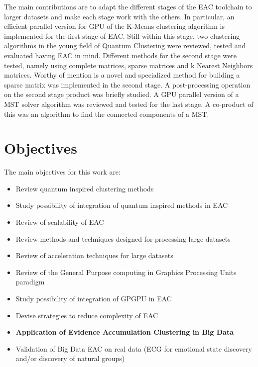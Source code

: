 The main contributions are to adapt the different stages of the EAC toolchain to larger datasets and make each stage work with the others.
In particular, an efficient parallel version for GPU of the K-Means clustering algorithm is implemented for the first stage of EAC.
Still within this stage, two clustering algorithms in the young field of Quantum Clustering were reviewed, tested and evaluated having EAC in mind. %
Different methods for the second stage were tested, namely using complete matrices, sparse matrices and k Nearest Neighbors matrices.
Worthy of mention is a novel and specialized method for building a sparse matrix was implemented in the second stage. %
A post-processing operation on the second stage product was briefly studied. %
A GPU parallel version of a MST solver algorithm was reviewed and tested for the last stage.
A co-product of this was an algorithm to find the connected components of a MST.


\section{Objectives}
The main objectives for this work are:
\begin{itemize}

\item Review quantum inspired clustering methods

\item Study possibility of integration of quantum inspired methods in EAC

\item Review of scalability of EAC

\item Review methods and techniques designed for processing large datasets

\item Review of acceleration techniques for large datasets

\item Review of the General Purpose computing in Graphics Processing Units paradigm

\item Study possibility of integration of GPGPU in EAC

\item Devise strategies to reduce complexity of EAC

\item \textbf{Application of Evidence Accumulation Clustering in Big Data}

\item Validation of Big Data EAC on real data (ECG for emotional state discovery and/or discovery of natural groups)
\end{itemize}


